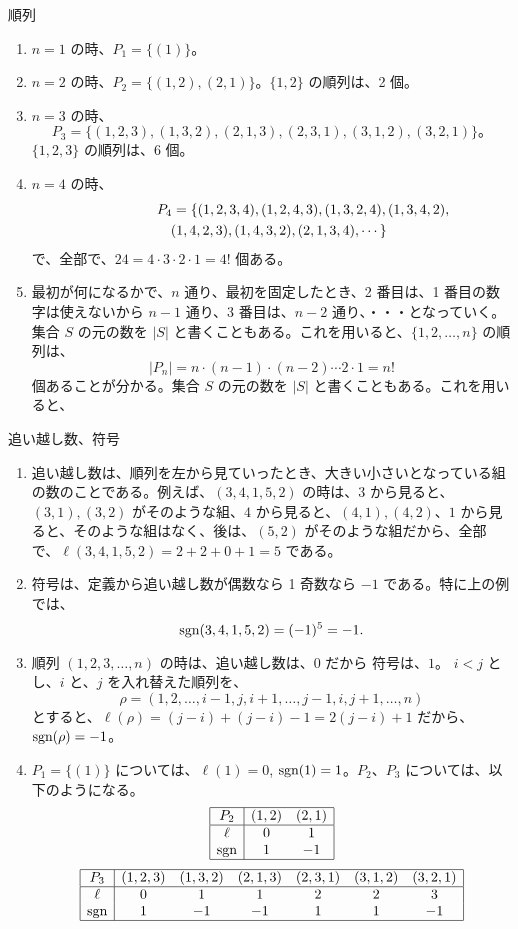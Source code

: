 \begin{eg}
順列
\begin{enumerate}
\item $n = 1$ の時、$P_1 = \{(1)\}$。
\item $n = 2$ の時、$P_2 = \{(1,2),(2,1)\}$。$\{1,2\}$ の順列は、2 個。
\item $n = 3$ の時、
$$P_3 = \{(1,2,3),(1,3,2),(2,1,3),(2,3,1),(3,1,2),(3,2,1)\}。$$
$\{1,2,3\}$ の順列は、6 個。
\item $n = 4$ の時、
\begin{eqnarray*}
\lefteqn{P_4 = \{(1,2,3,4),(1,2,4,3),(1,3,2,4),(1,3,4,2),}\\
& & (1,4,2,3),(1,4,3,2),(2,1,3,4),\cdots\}
\end{eqnarray*}
で、全部で、$24  = 4\cdot 3\cdot 2\cdot 1 = 4!$ 個ある。
\item 最初が何になるかで、$n$ 通り、最初を固定したとき、2 番目は、1 番目の数字は使えないから $n-1$ 通り、3 番目は、$n-2$ 通り、・・・となっていく。集合 $S$ の元の数を $|S|$ と書くこともある。これを用いると、$\{1,2,\ldots,n\}$ の順列は、
$$|P_n| = n\cdot (n-1)\cdot (n-2)\cdots 2\cdot 1 = n!$$
個あることが分かる。集合 $S$ の元の数を $|S|$ と書くこともある。これを用いると、
\end{enumerate}
\end{eg}

\begin{eg}
追い越し数、符号
\begin{enumerate}
\item 追い越し数は、順列を左から見ていったとき、大きい小さいとなっている組の数のことである。例えば、$(3,4,1,5,2)$ の時は、$3$  から見ると、$(3,1),(3,2)$ がそのような組、$4$ から見ると、$(4,1), (4,2)$、$1$ から見ると、そのような組はなく、後は、$(5,2)$ がそのような組だから、全部で、$\ell(3,4,1,5,2) = 2+2+0+1 = 5$ である。
\item 符号は、定義から追い越し数が偶数なら 1 奇数なら $-1$ である。特に上の例では、
$$\mbox{{\rm sgn}}(3,4,1,5,2) = (-1)^5 = -1.$$
\item 順列 $(1,2,3,\ldots,n)$ の時は、追い越し数は、$0$ だから 符号は、$1$。
$i<j$ とし、$i$ と、$j$ を入れ替えた順列を、
$$\rho = (1,2,\ldots, i-1, j, i+1, \ldots, j-1, i, j+1, \ldots, n)$$
とすると、$\ell(\rho) = (j-i) + (j-i)-1 = 2(j-i)+1$ だから、$\mbox{{\rm sgn}}(\rho) = -1$。
\item $P_1 = \{(1)\}$  については、$\ell(1) = 0$, $\mbox{{\rm sgn}}(1) = 1$。$P_2$、$P_3$ については、以下のようになる。
$$\begin{array}{|c|cc|}
\hline
P_2 & (1,2) & (2,1)\\
\hline
\ell & 0 & 1\\
\mbox{{\rm sgn}} & 1 & -1\\
\hline
\end{array}$$
$$\begin{array}{|c|cccccc|}
\hline
P_3 & (1,2,3) & (1,3,2) & (2,1,3) & (2,3,1) & (3,1,2) & (3,2,1)\\
\hline
\ell & 0 & 1 & 1 & 2 & 2 & 3\\
\mbox{{\rm sgn}} & 1 & -1 & -1 & 1 & 1 & -1\\
\hline
\end{array}$$
\end{enumerate}
\end{eg}

